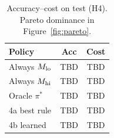 \begin{table}[t]
  \centering
  \small
  \begin{tabular}{@{}lcc@{}}
    \toprule
    \textbf{Policy} & \textbf{Acc} & \textbf{Cost} \\
    \midrule
    Always $M_{\mathrm{lo}}$ & \textsc{TBD} & \textsc{TBD} \\
    Always $M_{\mathrm{hi}}$ & \textsc{TBD} & \textsc{TBD} \\
    Oracle $\pi^*$ & \textsc{TBD} & \textsc{TBD} \\
    4a best rule & \textsc{TBD} & \textsc{TBD} \\
    4b learned & \textsc{TBD} & \textsc{TBD} \\
    \bottomrule
  \end{tabular}
  \caption{Accuracy--cost on test (H4). Pareto dominance in Figure~\ref{fig:pareto}.}
  \label{tab:routing-pareto}
\end{table}
